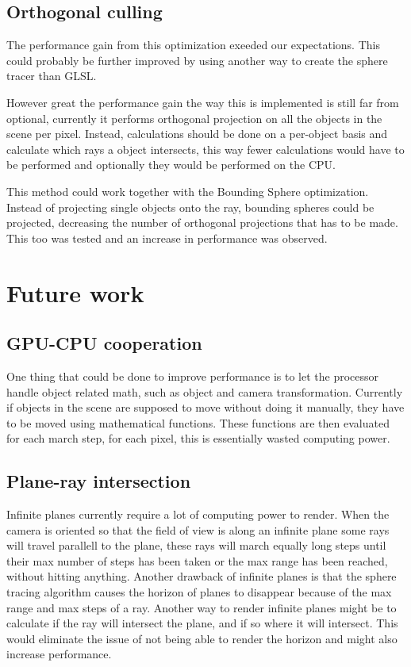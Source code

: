 		\subsection{Orthogonal culling}

			The performance gain from this optimization exeeded our 
			expectations. This could probably be further improved by using
			another way to create the sphere tracer than GLSL. 

			However great the performance gain the way this is implemented
			is still far from optional, currently it performs orthogonal 
			projection on all the objects in the scene per pixel. Instead,
			calculations should be done on a per-object basis and calculate
			which rays a object intersects, this way fewer calculations would
			have to be performed and optionally they would be performed on the
			CPU.

			This method could work together with the Bounding Sphere 
			optimization. Instead of projecting single objects onto the ray,
			bounding spheres could be projected, decreasing the number of 
			orthogonal projections that has to be made. This too was tested 
			and an increase in performance was observed.

	\section{Future work}

		\subsection{GPU-CPU cooperation}
		
			One thing that could be done to improve performance is to let the
			processor handle object related math, such as object and camera 
			transformation. Currently if objects in the scene are supposed to 
			move without doing it manually, they have to be moved using 
			mathematical functions. These functions are then evaluated for 
			each march step, for each pixel, this is essentially wasted 
			computing power.


		\subsection{Plane-ray intersection}

			Infinite planes currently require a lot of computing power to render. When
			the camera is oriented so that the field of view is along an infinite
			plane some rays will travel parallell to the plane, these rays will march 
			equally long steps until their max number of steps has been taken or
			the max range has been reached, without hitting anything. Another
			drawback of infinite planes is that the sphere tracing algorithm causes
			the horizon of planes to disappear because of the max range and max 
			steps of a ray. Another way to render infinite planes might be to 
			calculate if the ray will intersect the plane, and if so where it 
			will intersect. This would eliminate the issue of not being able 
			to render the horizon and might also increase performance.

